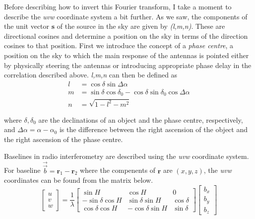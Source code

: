 Before describing how to invert this Fourier transform, I take a moment to describe the \textit{uvw} coordinate system a bit further.
As we saw, the components of the unit vector $\mathbf{s}$ of the source in the sky are given by \textit{(l,m,n)}. These are directional cosines and determine a position on the sky in terms of the direction cosines to that position. First we introduce the concept of a \textit{phase centre}, a position on the sky to which the main response of the antennas is pointed either by physically steering the antennas or introducing appropriate phase delay in the correlation described above.
\textit{l,m,n} can then be defined as
\begin{align*}
l &= \cos \delta  \sin \Delta \alpha \\ 
m &= \sin \delta \cos \delta_0 - \cos \delta \sin \delta_0 \cos\Delta \alpha \\ 
n &= \sqrt{1-l^2-m^2}
\end{align*}

where $\delta, \delta_0$ are the declinations of an object and the phase centre, respectively, and $\Delta \alpha = \alpha -\alpha_0$ is the difference between the right ascension of the object and the right ascension of the phase centre.

Baselines in radio interferometry are described using the \textit{uvw} coordinate system. For baseline $\overrightarrow{\Vec{b}} = \mathbf{r}_1 - \mathbf{r}_2$ where the compenents of $\mathbf{r}$ are $(x,y,z)$, the \textit{uvw} coordinates can be found from the matrix below.
\[
\begin{bmatrix}
    u \\
    v \\
    w
\end{bmatrix}
=
\dfrac{1}{\lambda}
\begin{bmatrix}
    \sin H       & \cos H & 0 \\
    -\sin \delta \cos H       & \sin \delta \sin H & \cos \delta \\
    \cos \delta \cos H       & -\cos \delta \sin H & \sin \delta
    

\end{bmatrix}
%
\begin{bmatrix}
    b_x \\
    b_y \\
    b_z
    

\end{bmatrix}
\]

